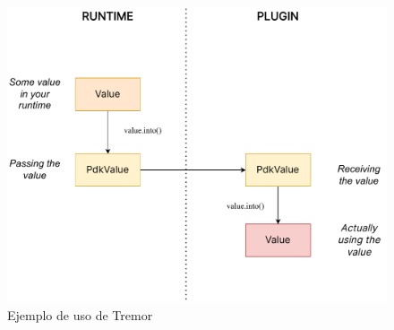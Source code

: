 \begin{figure}
    \centering
    \includegraphics[width=\textwidth]{./Imagenes/simplify.pdf}
    \caption{Ejemplo de uso de Tremor}%
    \label{fig:simplify}
\end{figure}
